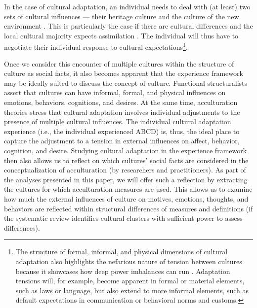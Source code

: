 \documentclass[man, 12pt, a4paper]{apa7}
\begin{document}
In the case of cultural adaptation, an individual needs to deal with (at least) two sets of cultural influences --- their heritage culture and the culture of the new environment \citep[e.g., see models of][]{Berry1997b, Berry2006a}. This is particularly the case if there are cultural differences \citep[e.g.][]{Triandis2001} and the local cultural majority expects assimilation \citep[e.g.,][]{Berry1997b, Berry2003}. The individual will thus have to negotiate their individual response to cultural expectations\footnote{The structure of formal, informal, and physical dimensions of cultural adaptation also highlights the nefarious nature of tension between cultures because it showcases how deep power imbalances can run \citep[e.g., see][]{Bhatia2001}. Adaptation tensions will, for example, become apparent in formal or material elements, such as laws or language, but also extend to more informal elements, such as default expectations in communication or behavioral norms and customs.}.

Once we consider this encounter of multiple cultures within the structure of culture as social facts, it also becomes apparent that the experience framework may be ideally suited to discuss the concept of culture.
Functional structuralists assert that cultures can have informal, formal, and physical influences on emotions, behaviors, cognitions, and desires. At the same time, acculturation theories stress that cultural adaptation involves individual adjustments to the presence of multiple cultural influences.
The individual cultural adaptation experience (i.e., the individual experienced ABCD) is, thus, the ideal place to capture the adjustment to a tension in external influences on affect, behavior, cognition, and desire. Studying cultural adaptation in the experience framework then also allows us to reflect on which cultures' social facts are considered in the conceptualization of acculturation (by researchers and practitioners). As part of the analyses presented in this paper, we will offer such a reflection by extracting the cultures for which acculturation measures are used. This allows us to examine how much the external influences of culture on motives, emotions, thoughts, and behaviors are reflected within structural differences of measures and definitions (if the systematic review identifies cultural clusters with sufficient power to assess differences).
\end{document}
